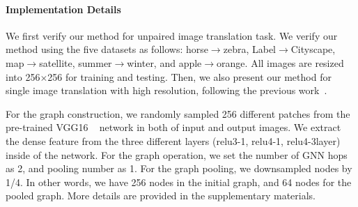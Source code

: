 \documentclass[letterpaper]{article} %
\begin{document}
\paragraph{Implementation Details}
We first verify our method for unpaired image translation task.
We verify our method using the five datasets as follows: horse$\rightarrow$zebra, Label$\rightarrow$Cityscape, map$\rightarrow$satellite, summer$\rightarrow$winter, and {apple$\rightarrow$orange}. All images are resized into 256$\times$256 for training and testing. Then, we also present our method for single image translation with high resolution, following the previous work~\cite{cut}.

For the graph construction, we randomly sampled 256 different patches from the pre-trained VGG16 ~\cite{vgg} network in both of input and output images. We extract the dense feature from the three different layers (relu3-1, relu4-1, relu4-3layer) inside of the network. For the graph operation, we set the number of GNN hops as 2, and pooling number as 1. For the graph pooling, we downsampled nodes by 1/4. In other words, we have 256 nodes in the initial graph, and 64 nodes for the pooled graph.
More details are provided in the supplementary materials.







\end{document}
